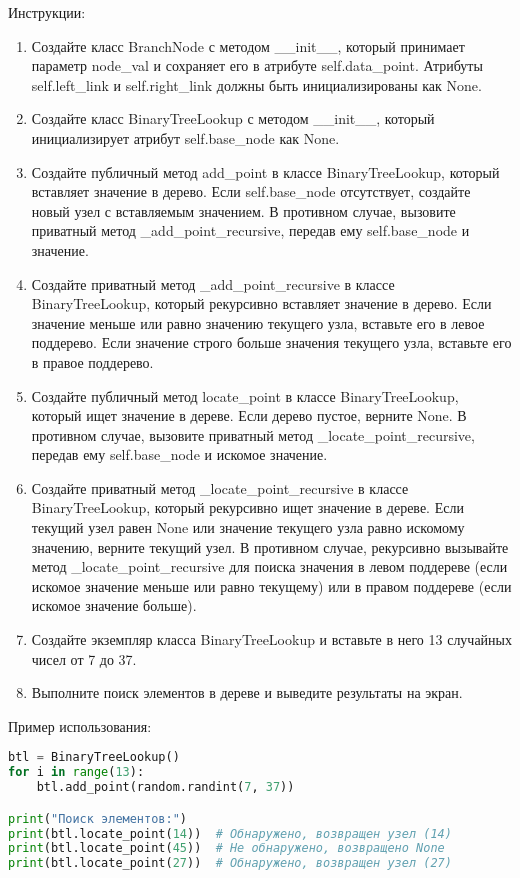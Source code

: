 \begin{enumerate}
Инструкции:
\begin{enumerate}
    \item Создайте класс BranchNode с методом \_\_init\_\_, который принимает параметр node\_val и сохраняет его в атрибуте self.data\_point. Атрибуты self.left\_link и self.right\_link должны быть инициализированы как None.
    \item Создайте класс BinaryTreeLookup с методом \_\_init\_\_, который инициализирует атрибут self.base\_node как None.
    \item Создайте публичный метод add\_point в классе BinaryTreeLookup, который вставляет значение в дерево. Если self.base\_node отсутствует, создайте новый узел с вставляемым значением. В противном случае, вызовите приватный метод \_add\_point\_recursive, передав ему self.base\_node и значение.
    \item Создайте приватный метод \_add\_point\_recursive в классе BinaryTreeLookup, который рекурсивно вставляет значение в дерево. Если значение меньше или равно значению текущего узла, вставьте его в левое поддерево. Если значение строго больше значения текущего узла, вставьте его в правое поддерево.
    \item Создайте публичный метод locate\_point в классе BinaryTreeLookup, который ищет значение в дереве. Если дерево пустое, верните None. В противном случае, вызовите приватный метод \_locate\_point\_recursive, передав ему self.base\_node и искомое значение.
    \item Создайте приватный метод \_locate\_point\_recursive в классе BinaryTreeLookup, который рекурсивно ищет значение в дереве. Если текущий узел равен None или значение текущего узла равно искомому значению, верните текущий узел. В противном случае, рекурсивно вызывайте метод \_locate\_point\_recursive для поиска значения в левом поддереве (если искомое значение меньше или равно текущему) или в правом поддереве (если искомое значение больше).
    \item Создайте экземпляр класса BinaryTreeLookup и вставьте в него 13 случайных чисел от 7 до 37.
    \item Выполните поиск элементов в дереве и выведите результаты на экран.
\end{enumerate}

Пример использования:
\begin{lstlisting}[language=Python]
btl = BinaryTreeLookup()
for i in range(13):
    btl.add_point(random.randint(7, 37))

print("Поиск элементов:")
print(btl.locate_point(14))  # Обнаружено, возвращен узел (14)
print(btl.locate_point(45))  # Не обнаружено, возвращено None
print(btl.locate_point(27))  # Обнаружено, возвращен узел (27)
\end{lstlisting}


\end{enumerate}
